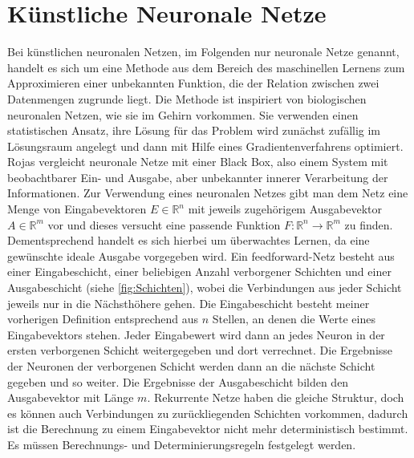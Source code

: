 \documentclass[
	12pt,
	a4paper,
	BCOR10mm,
	DIV14,
	listof=totoc,
	bibliography=totoc,
	headsepline
]{scrreprt}
\begin{document}
\section{Künstliche Neuronale Netze}
\label{hintergrund_nn}
Bei künstlichen neuronalen Netzen, im Folgenden nur neuronale Netze genannt, handelt es sich um eine Methode aus dem Bereich des maschinellen Lernens zum Approximieren einer unbekannten Funktion, die der Relation zwischen zwei Datenmengen zugrunde liegt. Die Methode ist inspiriert von biologischen neuronalen Netzen, wie sie im Gehirn vorkommen. 
Sie verwenden einen statistischen Ansatz, ihre Lösung für das Problem wird zunächst zufällig im Lösungsraum angelegt und dann mit Hilfe eines Gradientenverfahrens optimiert.
Rojas \cite{Rojas:1996:NNS:235222} vergleicht neuronale Netze mit einer Black Box, also einem System mit beobachtbarer Ein- und Ausgabe, aber unbekannter innerer Verarbeitung der Informationen. 
Zur Verwendung eines neuronalen Netzes gibt man dem Netz eine Menge von Eingabevektoren $E \in \mathbb{R}^n$ mit jeweils zugehörigem Ausgabevektor $A \in \mathbb{R}^m$ vor und dieses versucht eine passende Funktion $F: \mathbb{R}^n \rightarrow \mathbb{R}^m$ zu finden. Dementsprechend handelt es sich hierbei um überwachtes Lernen, da eine gewünschte ideale Ausgabe vorgegeben wird.
Ein feedforward-Netz besteht aus einer Eingabeschicht, einer beliebigen Anzahl verborgener Schichten und einer Ausgabeschicht (siehe \ref{fig:Schichten}), wobei die Verbindungen aus jeder Schicht jeweils nur in die Nächsthöhere gehen. 
Die Eingabeschicht besteht meiner vorherigen Definition entsprechend aus $n$ Stellen, an denen die Werte eines Eingabevektors stehen. Jeder Eingabewert wird dann an jedes Neuron in der ersten verborgenen Schicht weitergegeben und dort verrechnet. Die Ergebnisse der Neuronen der verborgenen Schicht werden dann an die nächste Schicht gegeben und so weiter.
Die Ergebnisse der Ausgabeschicht bilden den Ausgabevektor mit Länge $m$.
Rekurrente Netze haben die gleiche Struktur, doch es können auch Verbindungen zu zurückliegenden Schichten vorkommen, dadurch ist die Berechnung zu einem Eingabevektor nicht mehr deterministisch bestimmt. Es müssen Berechnungs- und Determinierungsregeln festgelegt werden. 
\end{document}

